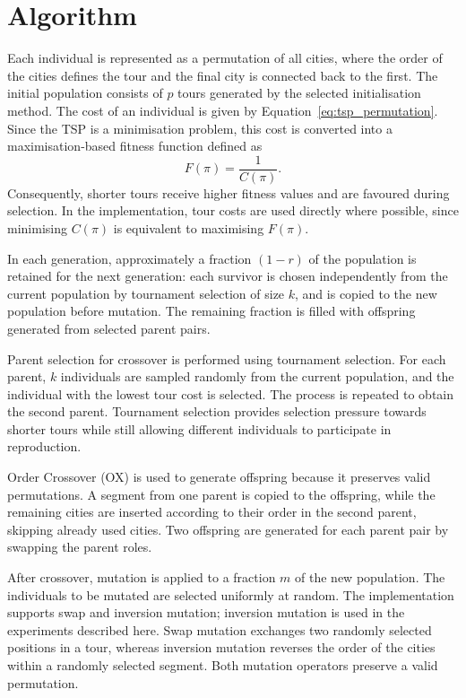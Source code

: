 \documentclass[11pt,a4paper]{article}
\begin{document}
\section{Algorithm}
\label{sec:algorithm}
Each individual is represented as a permutation of all cities, where the order
of the cities defines the tour and the final city is connected back to the first.
The initial population consists of $p$ tours generated by the selected
initialisation method.
The cost of an individual is given by Equation~\eqref{eq:tsp_permutation}.
Since the TSP is a minimisation problem, this cost is converted into a
maximisation-based fitness function defined as
\begin{equation}
    F(\pi) = \frac{1}{C(\pi)}.
    \label{eq:fitness}
\end{equation}
Consequently, shorter tours receive higher fitness values and are favoured
during selection. In the implementation,
tour costs are used directly where possible, since minimising $C(\pi)$ is
equivalent to maximising $F(\pi)$.

In each generation, approximately a fraction $(1-r)$ of the population is
retained for the next generation: each survivor is chosen independently from
the current population by tournament selection of size $k$, and is copied to
the new population before mutation. The remaining fraction is filled with
offspring generated from selected parent pairs.

Parent selection for crossover is performed using tournament selection.
For each parent, $k$ individuals are sampled randomly from the current
population, and the individual with the lowest tour cost is selected.
The process is repeated to obtain the second parent. Tournament selection
provides selection pressure towards shorter tours while still allowing
different individuals to participate in reproduction.

Order Crossover (OX) is used to generate offspring because it preserves valid permutations. A segment from one parent is copied to the offspring,
while the remaining cities are inserted according to their order in the second parent, skipping already used cities. Two offspring are generated for each parent pair
by swapping the parent roles.

After crossover, mutation is applied to a fraction $m$ of the new population. 
The individuals to be mutated are selected uniformly at random.
The implementation supports swap and inversion mutation; inversion mutation
is used in the experiments described here.
Swap mutation exchanges two randomly selected positions in a tour,
whereas inversion mutation reverses the order of the cities within a randomly
selected segment. Both mutation operators preserve a valid permutation.
\end{document}
